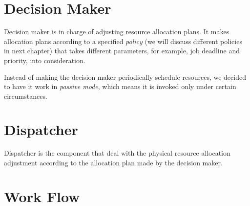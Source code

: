 \section{Decision Maker}

Decision maker is in charge of adjusting resource allocation plans.  It
makes allocation plans according to a specified \emph{policy} (we will
discuss different policies in next chapter) that takes different
parameters, for example, job deadline and priority, into consideration. 

Instead of making the decision maker periodically schedule resources, we
decided to have it work in \emph{passive mode}, which means it is
invoked only under certain circumstances.

\section{Dispatcher}

Dispatcher is the component that deal with the physical resource
allocation adjustment according to the allocation plan made by the
decision maker.

\section{Work Flow}


